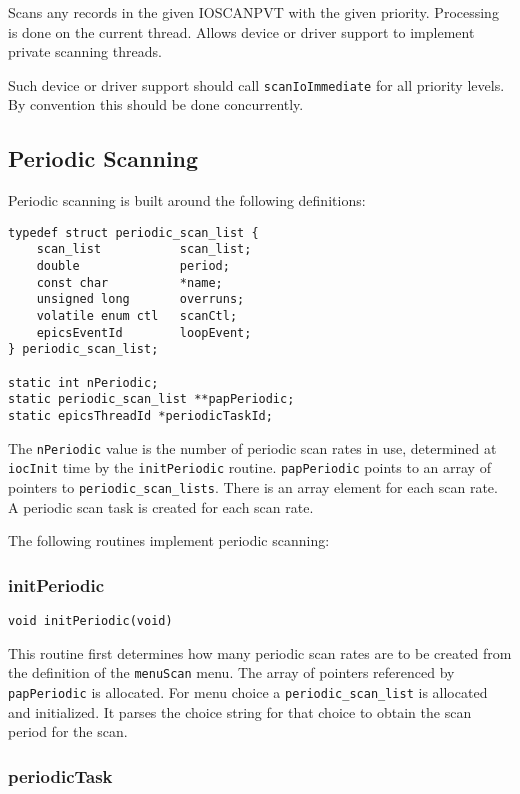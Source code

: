 Scans any records in the given IOSCANPVT with the given priority.
Processing is done on the current thread.
Allows device or driver support to implement private scanning threads.

Such device or driver support should call \verb|scanIoImmediate| for all priority levels.
By convention this should be done concurrently.

\subsection{Periodic Scanning}

Periodic scanning is built around the following definitions:

\begin{verbatim}
typedef struct periodic_scan_list {
    scan_list           scan_list;
    double              period;
    const char          *name;
    unsigned long       overruns;
    volatile enum ctl   scanCtl;
    epicsEventId        loopEvent;
} periodic_scan_list;

static int nPeriodic;
static periodic_scan_list **papPeriodic;
static epicsThreadId *periodicTaskId;
\end{verbatim}

The \verb|nPeriodic| value is the number of periodic scan rates in use, determined at \verb|iocInit| time by the \verb|initPeriodic| routine.
\verb|papPeriodic| points to an array of pointers to \verb|periodic_scan_lists|.
There is an array element for each scan rate.
A periodic scan task is created for each scan rate.

The following routines implement periodic scanning:

\subsubsection{initPeriodic}

\begin{verbatim}
void initPeriodic(void)
\end{verbatim}

This routine first determines how many periodic scan rates are to be created from the definition of the \verb|menuScan| menu.
The array of pointers referenced by \verb|papPeriodic| is allocated.
For menu choice a \verb|periodic_scan_list| is allocated and initialized.
It parses the choice string for that choice to obtain the scan period for the scan.

\subsubsection{periodicTask}

